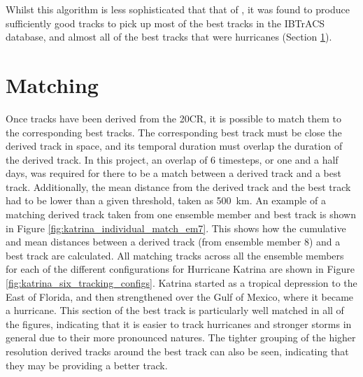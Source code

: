\documentclass[pdftex,12pt,a4paper]{report}
\begin{document}
Whilst this algorithm is less sophisticated that that of \textcite{hodges1994general}, it was found
to produce sufficiently good tracks to pick up most of the best tracks in the IBTrACS database, and
almost all of the best tracks that were hurricanes (Section \ref{sec:matching}). 


\section{Matching}
\label{sec:matching}

Once tracks have been derived from the 20CR, it is possible to match them to the corresponding best
tracks. The corresponding best track must be close the derived track in space, and its temporal
duration must overlap the duration of the derived track. In this project, an overlap of 6 timesteps,
or one and a half days, was required for there to be a match between a derived track and a best
track. Additionally, the mean distance from the derived track and the best track had to be lower
than a given threshold, taken as \SI{500}{km}. An example of a matching derived track taken from
one ensemble member and best track is shown in Figure \ref{fig:katrina_individual_match_em7}.
This shows how the cumulative and mean distances between a derived track (from ensemble member 8)
and a best track are calculated. All matching tracks across all the ensemble members for each of the
different configurations for Hurricane Katrina are shown in Figure
\ref{fig:katrina_six_tracking_configs}. Katrina started as a tropical depression to the East of
Florida, and then strengthened over the Gulf of Mexico, where it became a hurricane. This section of
the best track is particularly well matched in all of the figures, indicating that it is easier to
track hurricanes and stronger storms in general due to their more pronounced natures. The tighter
grouping of the higher resolution derived tracks around the best track can also be seen, indicating
that they may be providing a better track. 
\end{document}
